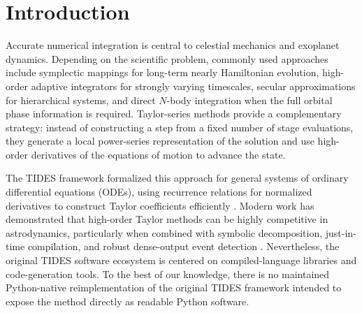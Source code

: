 \documentclass[11pt]{article}
\begin{document}
\begin{abstract}
validation itself, to machine precision across the full 22-template
catalog. A cross-package performance comparison against REBOUND is
deliberately narrow in scope: rather than a raw wall-clock benchmark, whose
naive form was found to conflate implementation-language differences with
numerical-method differences (and, for an isolated two-body problem, to be
confounded further by REBOUND's near-exact symplectic Kepler stepping), we
report the one comparison that is genuinely implementation-independent --
the arbitrary-precision path's ability to converge more than fifteen orders
of magnitude past the double-precision accuracy ceiling every fixed-precision
integrator, REBOUND included, is subject to.
\end{abstract}


\section{Introduction}

Accurate numerical integration is central to celestial mechanics and
exoplanet dynamics. Depending on the scientific problem, commonly used
approaches include symplectic mappings for long-term nearly Hamiltonian
evolution, high-order adaptive integrators for strongly varying timescales,
secular approximations for hierarchical systems, and direct $N$-body
integration when the full orbital phase information is required.
Taylor-series methods provide a complementary strategy: instead of
constructing a step from a fixed number of stage evaluations, they generate a
local power-series representation of the solution and use high-order
derivatives of the equations of motion to advance the state.

The TIDES framework formalized this approach for general systems of ordinary
differential equations (ODEs), using recurrence relations for normalized
derivatives to construct Taylor coefficients efficiently \citep{Abad2012}.
Modern work has demonstrated that high-order Taylor methods can be highly
competitive in astrodynamics, particularly when combined with symbolic
decomposition, just-in-time compilation, and robust dense-output event
detection \citep{Biscani2021,Biscani2022}. Nevertheless, the original TIDES
software ecosystem is centered on compiled-language libraries and
code-generation tools. To the best of our knowledge, there is no maintained
Python-native reimplementation of the original TIDES framework intended to
expose the method directly as readable Python software.
\end{document}
